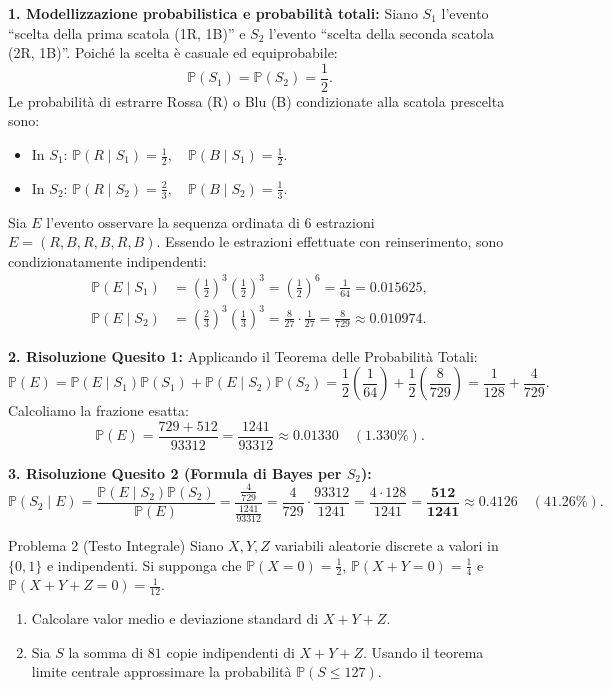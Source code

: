 \documentclass[11pt,a4paper]{article}
\newcommand{\Prob}{\mathbb{P}}
\begin{document}
\begin{soluzionebox}
\textbf{1. Modellizzazione probabilistica e probabilità totali:}
Siano $S_1$ l'evento ``scelta della prima scatola (1R, 1B)'' e $S_2$ l'evento ``scelta della seconda scatola (2R, 1B)''.
Poiché la scelta è casuale ed equiprobabile:
\[
\Prob(S_1) = \Prob(S_2) = \frac{1}{2}.
\]
Le probabilità di estrarre Rossa (R) o Blu (B) condizionate alla scatola prescelta sono:
\begin{itemize}
    \item In $S_1$: $\Prob(R \mid S_1) = \frac{1}{2}, \quad \Prob(B \mid S_1) = \frac{1}{2}$.
    \item In $S_2$: $\Prob(R \mid S_2) = \frac{2}{3}, \quad \Prob(B \mid S_2) = \frac{1}{3}$.
\end{itemize}
Sia $E$ l'evento osservare la sequenza ordinata di 6 estrazioni $E = (R, B, R, B, R, B)$.
Essendo le estrazioni effettuate con reinserimento, sono condizionatamente indipendenti:
\begin{align*}
\Prob(E \mid S_1) &= \left(\frac{1}{2}\right)^3 \left(\frac{1}{2}\right)^3 = \left(\frac{1}{2}\right)^6 = \frac{1}{64} = 0.015625, \\
\Prob(E \mid S_2) &= \left(\frac{2}{3}\right)^3 \left(\frac{1}{3}\right)^3 = \frac{8}{27} \cdot \frac{1}{27} = \frac{8}{729} \approx 0.010974.
\end{align*}

\textbf{2. Risoluzione Quesito 1:}
Applicando il Teorema delle Probabilità Totali:
\[
\Prob(E) = \Prob(E \mid S_1)\Prob(S_1) + \Prob(E \mid S_2)\Prob(S_2) = \frac{1}{2}\left(\frac{1}{64}\right) + \frac{1}{2}\left(\frac{8}{729}\right) = \frac{1}{128} + \frac{4}{729}.
\]
Calcoliamo la frazione esatta:
\[
\Prob(E) = \frac{729 + 512}{93312} = \frac{1241}{93312} \approx \bm{0.01330} \quad (\bm{1.330\%}).
\]

\textbf{3. Risoluzione Quesito 2 (Formula di Bayes per $S_2$):}
\[
\Prob(S_2 \mid E) = \frac{\Prob(E \mid S_2)\Prob(S_2)}{\Prob(E)} = \frac{\frac{4}{729}}{\frac{1241}{93312}} = \frac{4}{729} \cdot \frac{93312}{1241} = \frac{4 \cdot 128}{1241} = \bm{\frac{512}{1241}} \approx \bm{0.4126} \quad (\bm{41.26\%}).
\]
\end{soluzionebox}

\begin{problemabox}{Problema 2 (Testo Integrale)}
Siano $X,Y,Z$ variabili aleatorie discrete a valori in $\{0,1\}$ e indipendenti. Si supponga che $\Prob(X = 0) = \frac{1}{2}$, $\Prob(X+Y = 0) = \frac{1}{4}$ e $\Prob(X+Y+Z = 0) = \frac{1}{12}$.
\begin{enumerate}
    \item Calcolare valor medio e deviazione standard di $X+Y+Z$.
    \item Sia $S$ la somma di $81$ copie indipendenti di $X+Y+Z$. Usando il teorema limite centrale approssimare la probabilità $\Prob(S \le 127)$.
\end{enumerate}
\end{problemabox}
\end{document}
